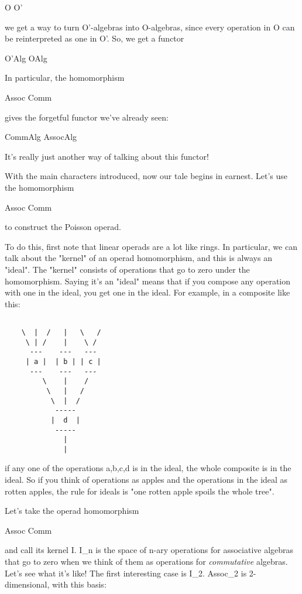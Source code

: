 O \to  O'

we get a way to turn O'-algebras into O-algebras, since every
operation in O can be reinterpreted as one in O'.  So, we get a
functor

O'Alg \to  OAlg

In particular, the homomorphism

Assoc \to  Comm

gives the forgetful functor we've already seen:

CommAlg \to  AssocAlg

It's really just another way of talking about this functor!

With the main characters introduced, now our tale begins in earnest.
Let's use the homomorphism

Assoc \to  Comm 

to construct the Poisson operad.

To do this, first note that linear operads are a lot like rings.  In
particular, we can talk about the "kernel" of an operad
homomorphism, and this is always an "ideal".  The
"kernel" consists of operations that go to zero under the
homomorphism.  Saying it's an "ideal" means that if you
compose any operation with one in the ideal, you get one in the ideal.
For example, in a composite like this:


\begin{verbatim}

    \  |  /   |   \   /    
     \ | /    |    \ /    
      ---    ---   ---   
     | a |  | b | | c | 
      ---    ---   --- 
         \    |    /
          \   |   /  
           \  |  / 
            ----- 
           |  d  |  
            -----  
              |   
              |  
\end{verbatim}
    
if any one of the operations a,b,c,d is in the ideal, the whole
composite is in the ideal.  So if you think of operations as
apples and the operations in the ideal as rotten apples, the rule 
for ideals is "one rotten apple spoils the whole
tree".  

Let's take the operad homomorphism

Assoc \to  Comm

and call its kernel I.  I_{n} is the space of n-ary operations
for associative algebras that go to zero when we think of them as
operations for \emph{commutative} algebras.  Let's see what it's like!
The first interesting case is I_{2}.  Assoc_{2} is
2-dimensional, with this basis:

